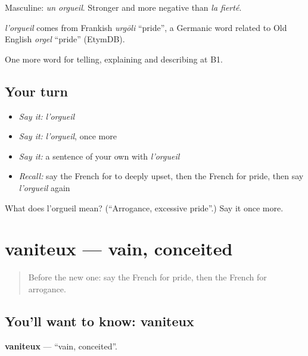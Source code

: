 Masculine: \emph{un orgueil}. Stronger and more negative than \emph{la fierté}.

\begin{cousinweb}
\emph{l'orgueil} comes from Frankish \emph{urgōli} \textquotedblleft{}pride\textquotedblright{}, a Germanic word related to Old English \emph{orgel} \textquotedblleft{}pride\textquotedblright{} (EtymDB).
\end{cousinweb}

\begin{grammarlens}[title={What you've built}]
One more word for telling, explaining and describing at B1.
\end{grammarlens}

\subsection*{Your turn}
\begin{itemize}
\raggedright
  \item \emph{Say it:} \emph{l'orgueil}
  \item \emph{Say it:} \emph{l'orgueil}, once more
  \item \emph{Say it:} a sentence of your own with \emph{l'orgueil}
  \item \emph{Recall:} say the French for to deeply upset, then the French for pride, then say \emph{l'orgueil} again
\end{itemize}

\begin{tcolorbox}[breakable,colback=teal!4,colframe=teal!35!black,title={Before you move on}]
What does l'orgueil mean? (\textquotedblleft{}Arrogance, excessive pride\textquotedblright{}.) Say it once more.
\end{tcolorbox}
\section[vaniteux]{vaniteux — vain, conceited}

\label{lesson:FR-C473-vaniteux}



\begin{quote}
Before the new one: say the French for pride, then the French for arrogance.
\end{quote}

\subsection*{You'll want to know: vaniteux}
\textbf{vaniteux} — \textquotedblleft{}vain, conceited\textquotedblright{}.

